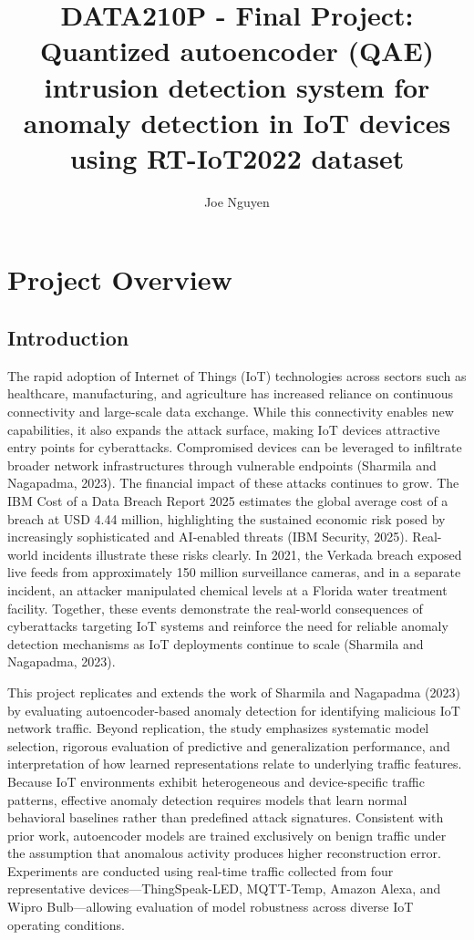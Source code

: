 \documentclass[
  letterpaper,
  DIV=11,
  numbers=noendperiod]{scrartcl}
\title{DATA210P - Final Project: Quantized autoencoder (QAE) intrusion
detection system for anomaly detection in IoT devices using RT-IoT2022
dataset}
\author{Joe Nguyen}
\date{}
\renewcommand*\contentsname{Table of contents}
\newcommand\contentsname{Table of contents}
\begin{document}
\maketitle

\renewcommand*\contentsname{Table of contents}
{
\hypersetup{linkcolor=}
\setcounter{tocdepth}{3}
\tableofcontents
}

\section{Project Overview}\label{project-overview}

\subsection{Introduction}\label{introduction}

The rapid adoption of Internet of Things (IoT) technologies across
sectors such as healthcare, manufacturing, and agriculture has increased
reliance on continuous connectivity and large-scale data exchange. While
this connectivity enables new capabilities, it also expands the attack
surface, making IoT devices attractive entry points for cyberattacks.
Compromised devices can be leveraged to infiltrate broader network
infrastructures through vulnerable endpoints (Sharmila and Nagapadma,
2023). The financial impact of these attacks continues to grow. The IBM
Cost of a Data Breach Report 2025 estimates the global average cost of a
breach at USD 4.44 million, highlighting the sustained economic risk
posed by increasingly sophisticated and AI-enabled threats (IBM
Security, 2025). Real-world incidents illustrate these risks clearly. In
2021, the Verkada breach exposed live feeds from approximately 150
million surveillance cameras, and in a separate incident, an attacker
manipulated chemical levels at a Florida water treatment facility.
Together, these events demonstrate the real-world consequences of
cyberattacks targeting IoT systems and reinforce the need for reliable
anomaly detection mechanisms as IoT deployments continue to scale
(Sharmila and Nagapadma, 2023).

This project replicates and extends the work of Sharmila and Nagapadma
(2023) by evaluating autoencoder-based anomaly detection for identifying
malicious IoT network traffic. Beyond replication, the study emphasizes
systematic model selection, rigorous evaluation of predictive and
generalization performance, and interpretation of how learned
representations relate to underlying traffic features. Because IoT
environments exhibit heterogeneous and device-specific traffic patterns,
effective anomaly detection requires models that learn normal behavioral
baselines rather than predefined attack signatures. Consistent with
prior work, autoencoder models are trained exclusively on benign traffic
under the assumption that anomalous activity produces higher
reconstruction error. Experiments are conducted using real-time traffic
collected from four representative devices---ThingSpeak-LED, MQTT-Temp,
Amazon Alexa, and Wipro Bulb---allowing evaluation of model robustness
across diverse IoT operating conditions.
\end{document}
